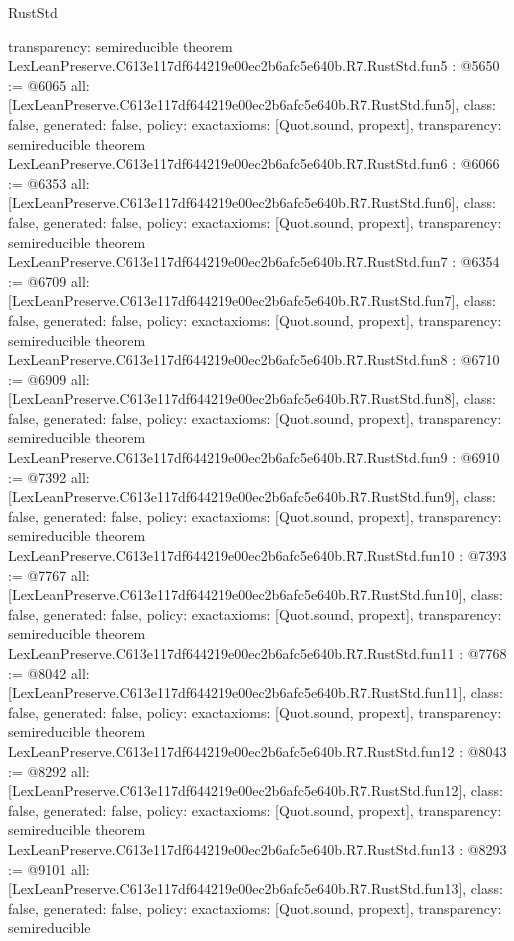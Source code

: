 \begin{lexlean}{RustStd}
\begin{coremodule}
{  transparency: semireducible
}
theorem LexLeanPreserve.C613e117df644219e00ec2b6afc5e640b.R7.RustStd.fun5 : @5650 := @6065 {
  all: [LexLeanPreserve.C613e117df644219e00ec2b6afc5e640b.R7.RustStd.fun5],
  class: false,
  generated: false,
  policy: exact{axioms: [Quot.sound, propext]},
  transparency: semireducible
}
theorem LexLeanPreserve.C613e117df644219e00ec2b6afc5e640b.R7.RustStd.fun6 : @6066 := @6353 {
  all: [LexLeanPreserve.C613e117df644219e00ec2b6afc5e640b.R7.RustStd.fun6],
  class: false,
  generated: false,
  policy: exact{axioms: [Quot.sound, propext]},
  transparency: semireducible
}
theorem LexLeanPreserve.C613e117df644219e00ec2b6afc5e640b.R7.RustStd.fun7 : @6354 := @6709 {
  all: [LexLeanPreserve.C613e117df644219e00ec2b6afc5e640b.R7.RustStd.fun7],
  class: false,
  generated: false,
  policy: exact{axioms: [Quot.sound, propext]},
  transparency: semireducible
}
theorem LexLeanPreserve.C613e117df644219e00ec2b6afc5e640b.R7.RustStd.fun8 : @6710 := @6909 {
  all: [LexLeanPreserve.C613e117df644219e00ec2b6afc5e640b.R7.RustStd.fun8],
  class: false,
  generated: false,
  policy: exact{axioms: [Quot.sound, propext]},
  transparency: semireducible
}
theorem LexLeanPreserve.C613e117df644219e00ec2b6afc5e640b.R7.RustStd.fun9 : @6910 := @7392 {
  all: [LexLeanPreserve.C613e117df644219e00ec2b6afc5e640b.R7.RustStd.fun9],
  class: false,
  generated: false,
  policy: exact{axioms: [Quot.sound, propext]},
  transparency: semireducible
}
theorem LexLeanPreserve.C613e117df644219e00ec2b6afc5e640b.R7.RustStd.fun10 : @7393 := @7767 {
  all: [LexLeanPreserve.C613e117df644219e00ec2b6afc5e640b.R7.RustStd.fun10],
  class: false,
  generated: false,
  policy: exact{axioms: [Quot.sound, propext]},
  transparency: semireducible
}
theorem LexLeanPreserve.C613e117df644219e00ec2b6afc5e640b.R7.RustStd.fun11 : @7768 := @8042 {
  all: [LexLeanPreserve.C613e117df644219e00ec2b6afc5e640b.R7.RustStd.fun11],
  class: false,
  generated: false,
  policy: exact{axioms: [Quot.sound, propext]},
  transparency: semireducible
}
theorem LexLeanPreserve.C613e117df644219e00ec2b6afc5e640b.R7.RustStd.fun12 : @8043 := @8292 {
  all: [LexLeanPreserve.C613e117df644219e00ec2b6afc5e640b.R7.RustStd.fun12],
  class: false,
  generated: false,
  policy: exact{axioms: [Quot.sound, propext]},
  transparency: semireducible
}
theorem LexLeanPreserve.C613e117df644219e00ec2b6afc5e640b.R7.RustStd.fun13 : @8293 := @9101 {
  all: [LexLeanPreserve.C613e117df644219e00ec2b6afc5e640b.R7.RustStd.fun13],
  class: false,
  generated: false,
  policy: exact{axioms: [Quot.sound, propext]},
  transparency: semireducible
}
\end{coremodule}
\end{lexlean}
